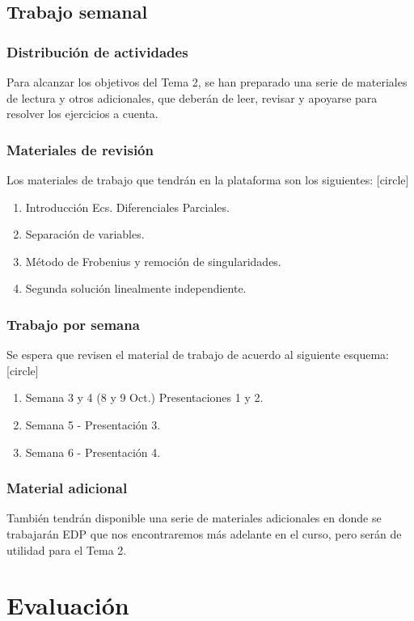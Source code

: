 \subsection{Trabajo semanal}
\begin{frame}
\frametitle{Distribución de actividades}
Para alcanzar los objetivos del Tema 2, se han preparado una serie de materiales de lectura y otros adicionales, que deberán de leer, revisar y apoyarse para resolver los ejercicios a cuenta.
\end{frame}
\begin{frame}
\frametitle{Materiales de revisión}
Los materiales de trabajo que tendrán en la plataforma son los siguientes:
[circle]
\begin{enumerate}[<+->]
\item Introducción Ecs. Diferenciales Parciales.
\item Separación de variables.
\item Método de Frobenius y remoción de singularidades.
\item Segunda solución linealmente independiente.
\end{enumerate}
\end{frame}
\begin{frame}
\frametitle{Trabajo por semana}
Se espera que revisen el material de trabajo de acuerdo al siguiente esquema:
[circle]
\begin{enumerate}[<+->]
\item Semana 3 y 4 (8 y 9 Oct.) Presentaciones 1 y 2.
\item Semana 5 - Presentación 3.
\item Semana 6 - Presentación 4.
\end{enumerate}
\end{frame}
\begin{frame}
\frametitle{Material adicional}
También tendrán disponible una serie de materiales adicionales en donde se trabajarán EDP que nos encontraremos más adelante en el curso, pero serán de utilidad para el Tema 2.
\end{frame}
\section{Evaluación}
